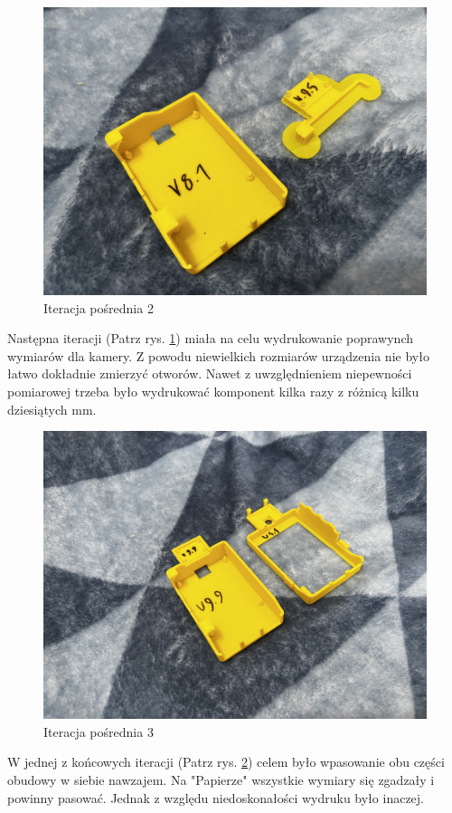 \documentclass[a4paper,12pt,reqno]{article}
\begin{document}
\begin{figure}[H]%
\centering
\includegraphics[width=0.8\columnwidth]{imgs/print_2.jpg}
\caption{Iteracja pośrednia 2 \label{PDCA_02}}
\quad
\end{figure}

Następna iteracji (Patrz rys. \ref{PDCA_02}) miała na celu wydrukowanie poprawynch wymiarów dla kamery. Z powodu niewielkich rozmiarów urządzenia nie było łatwo dokładnie zmierzyć otworów. Nawet z uwzględnieniem niepewności pomiarowej trzeba było wydrukować komponent kilka razy z różnicą kilku dziesiątych mm.

\begin{figure}[H]%
\centering
\includegraphics[width=0.8\columnwidth]{imgs/print_3.jpg}
\caption{Iteracja pośrednia 3 \label{PDCA_03}}
\quad
\end{figure}

W jednej z końcowych iteracji (Patrz rys. \ref{PDCA_03}) celem było wpasowanie obu części obudowy w siebie nawzajem. Na "Papierze" wszystkie wymiary się zgadzały i powinny pasować. Jednak z względu niedoskonałości wydruku było inaczej.
\end{document}
